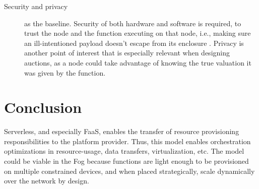 \documentclass[11pt]{sdm}
\begin{document}
\begin{description}
	\item[Security and privacy] as the baseline. Security of both hardware and software is required, to trust the node and the function executing on that node, i.e., making sure an ill-intentioned payload doesn't escape from its enclosure \cite{maurice_hello_2017}. Privacy is another point of interest that is especially relevant when designing auctions, as a node could take advantage of knowing the true valuation it was given by the function.
\end{description}




\section{Conclusion}

Serverless, and especially \gls{FaaS}, enables the transfer of resource provisioning responsibilities to the platform provider. Thus, this model enables orchestration optimizations in resource-usage, data transfers, virtualization, etc. The model could be viable in the Fog because functions are light enough to be provisioned on multiple constrained devices, and when placed strategically, scale dynamically over the network by design.
\end{document}

